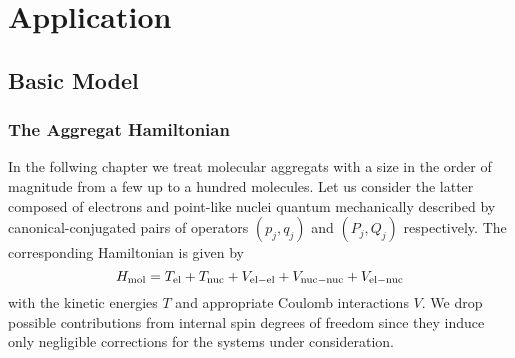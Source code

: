 \chapter{Application}
\label{chap:app}



\section{Basic Model}
\label{sec:app.model}
%

\subsection{The Aggregat Hamiltonian}
\label{sub:app.model.hamiltonian}

%

In the follwing chapter we treat molecular aggregats with a size in the order of magnitude from a few up to a hundred molecules.
Let us consider the latter composed of electrons and point-like nuclei quantum mechanically described by canonical-conjugated pairs of operators $(p_j, q_j)$ and $(P_j, Q_j)$ respectively.
The corresponding Hamiltonian is given by
\begin{equation}
  H_\mathrm{mol} = T_\mathrm{el} + T_\mathrm{nuc} + V_\mathrm{el-el} + V_\mathrm{nuc-nuc} + V_\mathrm{el-nuc}
  \label{eq:app.mol_hamil}
\end{equation}
with the kinetic energies $T$ and appropriate Coulomb interactions $V$.
We drop possible contributions from internal spin degrees of freedom since they induce only negligible corrections for the systems under consideration.

